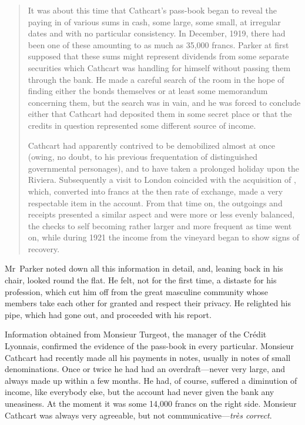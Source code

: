 \begin{quotation}
It was about this time that Cathcart's pass-book began to reveal the paying in of various sums in cash, some large, some small, at irregular dates and with no particular consistency. In December, 1919, there had been one of these amounting to as much as 35,000 francs.  Parker at first supposed that these sums might represent dividends from some separate securities which Cathcart was handling for himself without passing them through the bank. He made a careful search of the room in the hope of finding either the bonds themselves or at least some memorandum concerning them, but the search was in vain, and he was forced to conclude either that Cathcart had deposited them in some secret place or that the credits in question represented some different source of income.

Cathcart had apparently contrived to be demobilized almost at once (owing, no doubt, to his previous frequentation of distinguished governmental personages), and to have taken a prolonged holiday upon the Riviera. Subsequently a visit to London coincided with the acquisition of , which, converted into francs at the then rate of exchange, made a very respectable item in the account. From that time on, the outgoings and receipts presented a similar aspect and were more or less evenly balanced, the checks to self becoming rather larger and more frequent as time went on, while during 1921 the income from the vineyard began to show signs of recovery.

\end{quotation}

Mr~Parker noted down all this information in detail, and, leaning back in his chair, looked round the flat. He felt, not for the first time, a distaste for his profession, which cut him off from the great masculine community whose members take each other for granted and respect their privacy. He relighted his pipe, which had gone out, and proceeded with his report.

Information obtained from Monsieur Turgeot, the manager of the Crédit Lyonnais, confirmed the evidence of the pass-book in every particular.  Monsieur Cathcart had recently made all his payments in notes, usually in notes of small denominations. Once or twice he had had an overdraft—never very large, and always made up within a few months. He had, of course, suffered a diminution of income, like everybody else, but the account had never given the bank any uneasiness. At the moment it was some 14,000 francs on the right side. Monsieur Cathcart was always very agreeable, but not communicative—\foreignlanguage{french}{\textit{très correct}}.



